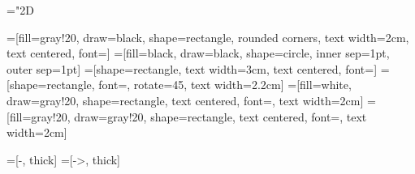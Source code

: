 \newcommand*\what[1]{\widehat{#1}}
\newcommand*\wtilde[1]{\widetilde{#1}}
\def\cg{\check{g}}
\def\wg{\what{g}}
\mathchardef\mhyphen="2D


\def\0b{\mathbf{0}}
\def\Db{\mathbf{D}}
\def\kb{\mathbf{k}}
\def\Kb{\mathbf{K}}
\def\Ib{\mathbf{I}}
\def\Sb{\mathbf{S}}
\def\GP{\mathsf{GP}}
\newcommand{\bea}{\begin{eqnarray*}}
\newcommand{\eea}{\end{eqnarray*}}
\newcommand{\be}{\begin{eqnarray}}
\newcommand{\ee}{\end{eqnarray}}
\def\wb{\mathbf{w}}
\def\SE{{\mathcal{E}}}%
\def\SN{{\mathcal{N}}}%
\def\pb{\mathbf{p}}
\newcommand{\Kbarbar}{\overline{K}_{|m}}
\newcommand{\Kbarbarb}{\overline{\Kb}_{|m}}
\def\mve{\varepsilon}
\newcommand{\Kbarbarp}{\overline{K'}_{|m}}
\newcommand{\Kbarbarpb}{\overline{\Kb'}_{|m}}
\newcommand{\fin} {\mbox{}~\hfill{\lower-0.3ex\hbox{$\triangleleft$}}}
\def\e1{\mathrm{e}}



=[fill={gray!20}, draw=black, shape=rectangle, rounded corners, text width=2cm, text centered, font={\scriptsize}]
=[fill=black, draw=black, shape=circle, inner sep=1pt, outer sep=1pt]
=[shape=rectangle, text width=3cm, text centered, font={\scriptsize}]
=[shape=rectangle, font={\scriptsize}, rotate=45, text width=2.2cm]
=[fill=white, draw={gray!20}, shape=rectangle, text centered, font={\scriptsize}, text width=2cm]
=[fill={gray!20}, draw={gray!20}, shape=rectangle, text centered, font={\scriptsize}, text width=2cm]

=[-, thick]
=[->, thick]





